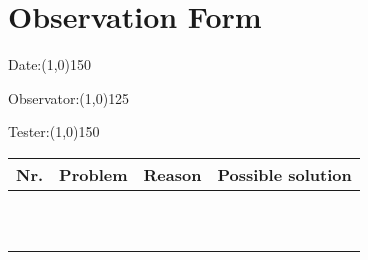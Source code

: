 \section{Observation Form}


\indent

Date:\line(1,0){150}
\vspace{5mm}

Observator:\line(1,0){125}
\vspace{5mm}

Tester:\line(1,0){150}
\vspace{5mm}

\begin{table}[h]
	\centering
	\begin{tabular}{| l | p{4cm} | p{4cm} | p{4cm} |}
	\hline
	{\bf Nr.} & {\bf Problem} & {\bf Reason} & {\bf Possible solution} \\ \hline
	& & & \\[1cm] \hline
	& & & \\[1cm] \hline 
	& & & \\[1cm] \hline 
	& & & \\[1cm] \hline 
	& & & \\[1cm] \hline 
	& & & \\[1cm] \hline
	& & & \\[1cm] \hline 
	& & & \\[1cm] \hline 
	& & & \\[1cm] \hline 
	& & & \\[1cm] \hline 
	\end{tabular}
\end{table}